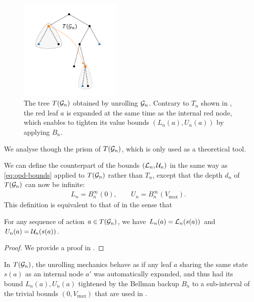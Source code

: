 \begin{figure}[htp]
	\centering
	\includegraphics[trim={2.cm 1cm 2.5cm 1cm}, clip, width=0.44\textwidth]{img/gbop/tree_5.pdf}
	\caption{The tree $T(\mathcal{G}_n)$ obtained by unrolling $\mathcal{G}_n$. Contrary to $T_n$ shown in , the red leaf $a$ is expanded at the same time as the internal red node, which enables to tighten its value bounds $(L_n(a), U_n(a))$ by applying $B_n$.}
	\label{fig:unroll}
\end{figure}
We analyse \GBOPD though the prism of $T(\mathcal{G}_n)$, which is only used as a theoretical tool. 

We can define the counterpart of the bounds $(\mathcal{L}_n, \mathcal{U}_n)$ in the same way as \eqref{eq:opd-bounds} applied to $T(\mathcal{G}_n)$ rather than $T_n$, except that the depth $d_n$ of $T(\mathcal{G}_n)$ can now be infinite:
\begin{align}
\label{eq:gbop-t-bounds}
L_n = B_n^{\infty}(0), \qquad U_n = B_n^{\infty}(V_{\max}).
\end{align}
This definition is equivalent to that of \GBOPD in the sense that
\begin{lemma}
	\label{lem:equivalence}
	\begin{leftbar}[lemmabar]
	For any sequence of action $a\in T(\mathcal{G}_n)$, we have $L_n(a) = \mathcal{L}_n(s(a))$ and $U_n(a) = \mathcal{U}_n(s(a))$.	
	\end{leftbar}
\end{lemma}
\begin{proof}
	We provide a proof in .
\end{proof}

In $T(\mathcal{G}_n)$, the unrolling mechanics behave as if any leaf $a$ sharing the same state $s(a)$ as an internal node $a'$ was automatically expanded, and thus had its bound $L_n(a), U_n(a)$ tightened by the Bellman backup $B_n$ to a sub-interval of the trivial bounds $(0, V_{\max})$ that are used in \OPD.

